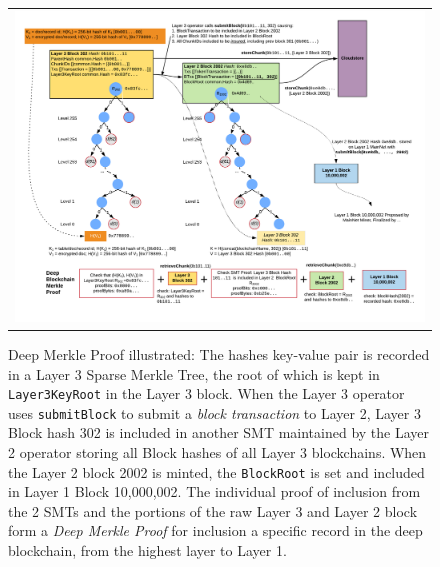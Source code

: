 \documentclass{article}
\begin{document}
\begin{figure}[t]
\begin{tabular}{c}
\includegraphics[width=17cm]{DeepMerkleProof.png} \\
\end{tabular}
\caption{\small Deep Merkle Proof illustrated: The hashes key-value pair is recorded in a Layer 3 Sparse Merkle Tree, the root of which is kept in \texttt{Layer3KeyRoot} in the Layer 3 block.  When the Layer 3 operator uses \texttt{submitBlock} to submit a {\em block transaction} to Layer 2,  Layer 3 Block hash 302 is included in another SMT maintained by the Layer 2 operator storing all Block hashes of all Layer 3 blockchains.  When the Layer 2 block 2002 is minted, the \texttt{BlockRoot} is set and included in Layer 1 Block 10,000,002.  The individual proof of inclusion from the 2 SMTs and the portions of the raw Layer 3 and Layer 2 block form a {\em Deep Merkle Proof} for inclusion a specific record in the deep blockchain, from the highest layer to Layer 1.}
\centering
\label{deepmerkleproof}
\end{figure}
\end{document}
